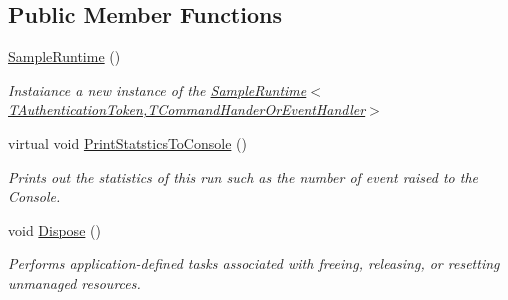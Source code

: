 \subsection*{Public Member Functions}
\begin{DoxyCompactItemize}
\item 
\hyperlink{classCqrs_1_1Configuration_1_1SampleRuntime_a9382e8b20b8701815ad20c1cd645c27b_a9382e8b20b8701815ad20c1cd645c27b}{Sample\+Runtime} ()
\begin{DoxyCompactList}\small\item\em Instaiance a new instance of the \hyperlink{classCqrs_1_1Configuration_1_1SampleRuntime_a9382e8b20b8701815ad20c1cd645c27b_a9382e8b20b8701815ad20c1cd645c27b}{Sample\+Runtime$<$\+T\+Authentication\+Token,\+T\+Command\+Hander\+Or\+Event\+Handler$>$} \end{DoxyCompactList}\item 
virtual void \hyperlink{classCqrs_1_1Configuration_1_1SampleRuntime_a058cc1b64ffab9b1f2d0a4ca196a17ab_a058cc1b64ffab9b1f2d0a4ca196a17ab}{Print\+Statstics\+To\+Console} ()
\begin{DoxyCompactList}\small\item\em Prints out the statistics of this run such as the number of event raised to the Console. \end{DoxyCompactList}\item 
void \hyperlink{classCqrs_1_1Configuration_1_1SampleRuntime_ae3729c9e4d130fb2e0c88246d58dc761_ae3729c9e4d130fb2e0c88246d58dc761}{Dispose} ()
\begin{DoxyCompactList}\small\item\em Performs application-\/defined tasks associated with freeing, releasing, or resetting unmanaged resources. \end{DoxyCompactList}\end{DoxyCompactItemize}
